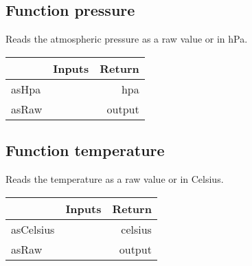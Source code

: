 \documentclass[a4paper,12pt,oneside,pdflatex,italian,final,twocolumn]{article}
\begin{document}
\raggedright
\subsection{Function pressure }
Reads the atmospheric pressure as a raw value or in hPa. \\

\centering
\begin{tabular}{lcr}
\toprule
  & Inputs & Return \\
\midrule
asHpa &
&
hpa
\\
asRaw &
&
output
\\
\bottomrule
\end{tabular}



\raggedright
\subsection{Function temperature }
Reads the temperature as a raw value or in Celsius. \\

\centering
\begin{tabular}{lcr}
\toprule
  & Inputs & Return \\
\midrule
asCelsius &
&
celsius
\\
asRaw &
&
output
\\
\bottomrule
\end{tabular}



\raggedright
\end{document}
